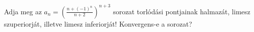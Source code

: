 \documentclass[11pt]{scrartcl}
\begin{document}
Adja meg az
\(\displaystyle
a_n = \left(
\frac{n + (-1)^n}{n + 2}
\right)^{n + 3}
\)
sorozat torlódási pontjainak halmazát, limesz szuperiorját, illetve limesz
inferiorját! Konvergens-e a sorozat?
\end{document}
